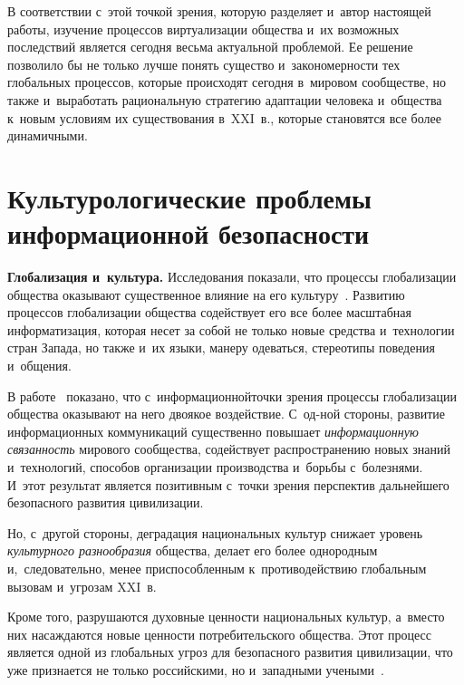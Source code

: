 \begin{multicols}{2}
     В соответствии с~этой точкой зрения, которую разделяет и~автор 
настоящей работы, изучение процессов виртуализации общества и~их 
возможных последствий является сегодня весьма актуальной проблемой. Ее 
решение позволило бы не только лучше понять существо и~закономерности 
тех глобальных процессов, которые происходят сегодня в~мировом 
сообществе, но также и~выработать рациональную стратегию адаптации 
человека и~общества к~новым условиям их существования в~XXI~в., которые 
становятся все более динамичными.
     
\section{Культурологические проблемы информационной 
безопасности}

\vspace*{-3pt}

     \textbf{Глобализация и~культура.} Исследования показали, что 
процессы глобализации общества оказывают существенное влияние на его 
культуру~\cite{24-kol}. Развитию процессов глобализации общества 
содействует его все более масштабная информатизация, которая несет за 
собой не только новые средства и~технологии стран Запада, но также и~их 
языки, манеру одеваться, стереотипы поведения и~общения. 
     
     В работе~\cite{25-kol} показано, что с~информационной\linebreak точки зрения 
процессы глобализации общества оказывают на него двоякое воздействие. 
С~од-\linebreak ной стороны, развитие информационных коммуникаций существенно 
повышает \textit{информационную \linebreak связанность} мирового сообщества, 
содействует распространению новых знаний и~технологий, способов 
организации производства и~борьбы с~болезнями. И~этот результат является 
позитивным с~точки зрения перспектив дальнейшего безопасного развития 
цивилизации.
     
     Но, с~другой стороны, деградация национальных культур снижает 
уровень \textit{культурного разнообразия} общества, делает его более 
однородным и,~следовательно, менее приспособленным к~противодействию 
глобальным вызовам и~угрозам XXI~в. 
     
     Кроме того, разрушаются духовные ценности национальных культур, 
а~вместо них насаждаются новые ценности потребительского общества. Этот 
процесс является одной из глобальных угроз для безопасного развития 
цивилизации, что уже признается не только российскими, но и~западными 
учеными~\cite{25-kol, 26-kol}.


\end{multicols}
